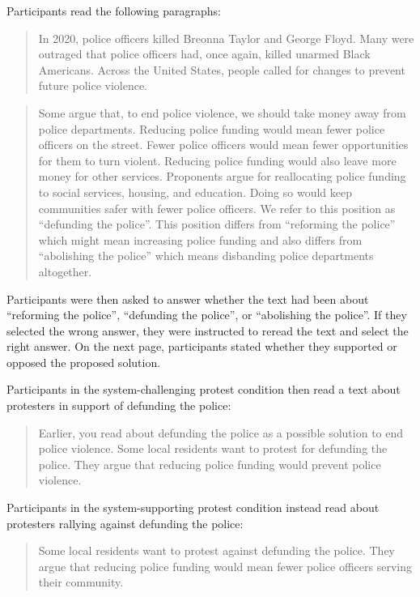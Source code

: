 \documentclass[twocolumn, 11pt, letterpaper]{article}
\begin{document}
Participants read the following paragraphs:

\begin{quote}
In 2020, police officers killed Breonna Taylor and George Floyd. Many
were outraged that police officers had, once again, killed unarmed Black
Americans. Across the United States, people called for changes to
prevent future police violence.
\end{quote}

\begin{quote}
Some argue that, to end police violence, we should take money away from
police departments. Reducing police funding would mean fewer police
officers on the street. Fewer police officers would mean fewer
opportunities for them to turn violent. Reducing police funding would
also leave more money for other services. Proponents argue for
reallocating police funding to social services, housing, and education.
Doing so would keep communities safer with fewer police officers. We
refer to this position as ``defunding the police''. This position
differs from ``reforming the police'' which might mean increasing police
funding and also differs from ``abolishing the police'' which means
disbanding police departments altogether.
\end{quote}

\noindent Participants were then asked to answer whether the text had
been about ``reforming the police'', ``defunding the police'', or
``abolishing the police''. If they selected the wrong answer, they were
instructed to reread the text and select the right answer. On the next
page, participants stated whether they supported or opposed the proposed
solution.

Participants in the system-challenging protest condition then read a
text about protesters in support of defunding the police:

\begin{quote}
Earlier, you read about defunding the police as a possible solution to
end police violence. Some local residents want to protest for defunding
the police. They argue that reducing police funding would prevent police
violence.
\end{quote}

\noindent Participants in the system-supporting protest condition
instead read about protesters rallying against defunding the police:

\begin{quote}
Some local residents want to protest against defunding the police. They
argue that reducing police funding would mean fewer police officers
serving their community.
\end{quote}
\end{document}

